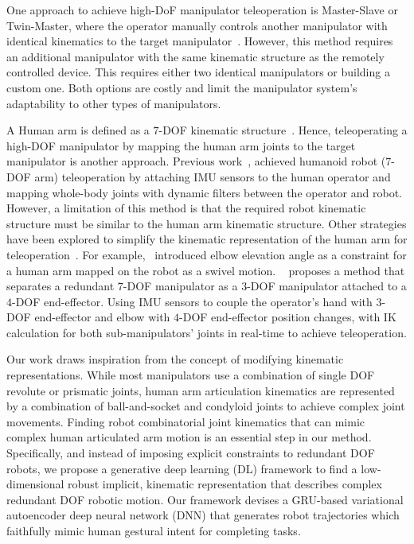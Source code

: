 One approach to achieve high-DoF manipulator teleoperation is Master-Slave or Twin-Master, where the operator manually controls another manipulator with identical kinematics to the target manipulator~\cite{singh_haptic-guided_2020,su_heterogeneous_2021}. However, this method requires an additional manipulator with the same kinematic structure as the remotely controlled device. This requires either two identical manipulators or building a custom one. Both options are costly and limit the manipulator system's adaptability to other types of manipulators. 

A Human arm is defined as a $7$-DOF kinematic structure~\cite{prokopenko_assessment_2001}. Hence, teleoperating a high-DOF manipulator by mapping the human arm joints to the target manipulator is another approach. Previous work~\cite{penco_robust_2018}, achieved humanoid robot ($7$-DOF arm) teleoperation by attaching IMU sensors to the human operator and mapping whole-body joints with dynamic filters between the operator and robot. However, a limitation of this method is that the required robot kinematic structure must be similar to the human arm kinematic structure. Other strategies have been explored to simplify the kinematic representation of the human arm for teleoperation~\cite{ajoudani_reduced-complexity_2018,su_deep_2019,arduengo_human_2021}. For example,~\cite{su_deep_2019} introduced elbow elevation angle as a constraint for a human arm mapped on the robot as a swivel motion. 
~\cite{arduengo_human_2021} proposes a method that separates a redundant $7$-DOF manipulator as a $3$-DOF manipulator attached to a $4$-DOF end-effector. Using IMU sensors to couple the operator's hand with $3$-DOF end-effector and elbow with $4$-DOF end-effector position changes, with IK calculation for both sub-manipulators' joints in real-time to achieve teleoperation.

Our work draws inspiration from the concept of modifying kinematic representations. While most manipulators use a combination of single DOF revolute or prismatic joints, human arm articulation kinematics are represented by a combination of ball-and-socket and condyloid joints to achieve complex joint movements. Finding robot combinatorial joint kinematics that can mimic complex human articulated arm motion is an essential step in our method. Specifically, and instead of imposing explicit constraints to redundant DOF robots, we propose a generative deep learning (DL) framework to find a low-dimensional robust implicit, kinematic representation that describes complex redundant DOF robotic motion. Our framework devises a GRU-based variational autoencoder deep neural network (DNN) that generates robot trajectories which faithfully mimic human gestural intent for completing tasks.

